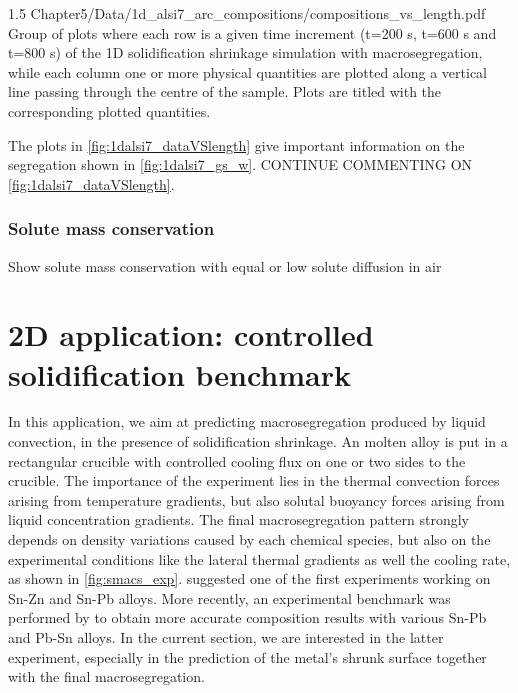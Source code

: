 \begin{landscape}
\begin{figureth}
{1.5}
{Chapter5/Data/1d_alsi7_arc_compositions/compositions_vs_length.pdf}
{Group of plots where each row is a given time increment (t=200 s, t=600 s and t=800 s) of the 1D solidification shrinkage simulation with macrosegregation, 
while each column one or more physical quantities are plotted along a vertical line passing through the centre of the sample. Plots are titled with the corresponding plotted quantities.}
\label{fig:1dalsi7_dataVSlength}
\end{figureth}
\end{landscape}

The plots in \cref{fig:1dalsi7_dataVSlength} give important information on the segregation shown in  \cref{fig:1dalsi7_gs_w}.
CONTINUE COMMENTING ON \cref{fig:1dalsi7_dataVSlength}.


\subsubsection{Solute mass conservation}

Show solute mass conservation with equal or low solute diffusion in air








\cleardoublepage
\section{2D application: controlled solidification benchmark}
In this application, we aim at predicting macrosegregation produced by liquid convection, in the presence of solidification shrinkage.
An molten alloy is put in a rectangular crucible with controlled cooling flux on one or two sides to the crucible. The importance of the experiment lies in the 
thermal convection forces arising from temperature gradients, but also solutal buoyancy forces arising from liquid concentration gradients. The final macrosegregation pattern
strongly depends on density variations caused by each chemical species, but also on the experimental conditions like the lateral thermal gradients as well the cooling rate,
as shown in \cref{fig:smacs_exp}.
\citet{hebditch_observations_1974} suggested one of the first experiments working on Sn-Zn and Sn-Pb alloys. 
More recently, an experimental benchmark was performed by \citet{hachani_experimental_2012} to obtain more accurate 
composition results with various Sn-Pb and Pb-Sn alloys. In the current section, we are interested in the latter experiment, especially in the prediction
of the metal's shrunk surface together with the final macrosegregation.

